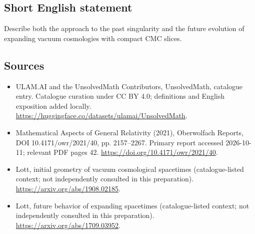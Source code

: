 \documentclass[11pt]{article}
\begin{document}
\subsection{Short English statement}
Describe both the approach to the past singularity and the future evolution of expanding vacuum cosmologies with compact CMC slices.
\subsection{Sources}
\begin{itemize}
\item[\hypertarget{source:statement:1}{S1}] ULAM.AI and the UnsolvedMath Contributors, UnsolvedMath, catalogue entry. Catalogue curation under CC BY 4.0; definitions and English exposition added locally.
\url{https://huggingface.co/datasets/ulamai/UnsolvedMath}.
\item[\hypertarget{source:statement:2}{S2}] Mathematical Aspects of General Relativity (2021), Oberwolfach Reports, DOI 10.4171/owr/2021/40, pp. 2157--2267. Primary report accessed 2026-10-11; relevant PDF pages 42.
\url{https://doi.org/10.4171/owr/2021/40}.
\item[\hypertarget{source:statement:3}{S3}] Lott, initial geometry of vacuum cosmological spacetimes (catalogue-listed context; not independently consulted in this preparation).
\url{https://arxiv.org/abs/1908.02185}.
\item[\hypertarget{source:statement:4}{S4}] Lott, future behavior of expanding spacetimes (catalogue-listed context; not independently consulted in this preparation).
\url{https://arxiv.org/abs/1709.03952}.
\end{itemize}
\label{end:statement}
\end{document}
